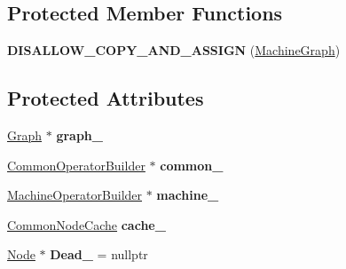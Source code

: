 \subsection*{Protected Member Functions}
\begin{DoxyCompactItemize}
\item 
\mbox{\label{classv8_1_1internal_1_1compiler_1_1MachineGraph_a85b5c32a6664345b2ca5fa4879167201}} 
{\bfseries D\+I\+S\+A\+L\+L\+O\+W\+\_\+\+C\+O\+P\+Y\+\_\+\+A\+N\+D\+\_\+\+A\+S\+S\+I\+GN} (\mbox{\hyperlink{classv8_1_1internal_1_1compiler_1_1MachineGraph}{Machine\+Graph}})
\end{DoxyCompactItemize}
\subsection*{Protected Attributes}
\begin{DoxyCompactItemize}
\item 
\mbox{\label{classv8_1_1internal_1_1compiler_1_1MachineGraph_a2d576e20daa768bd2992f6803fcf4fa6}} 
\mbox{\hyperlink{classv8_1_1internal_1_1compiler_1_1Graph}{Graph}} $\ast$ {\bfseries graph\+\_\+}
\item 
\mbox{\label{classv8_1_1internal_1_1compiler_1_1MachineGraph_afe1aba918b31ce63f7d096d805a11be3}} 
\mbox{\hyperlink{classv8_1_1internal_1_1compiler_1_1CommonOperatorBuilder}{Common\+Operator\+Builder}} $\ast$ {\bfseries common\+\_\+}
\item 
\mbox{\label{classv8_1_1internal_1_1compiler_1_1MachineGraph_ae301dbeb638badb41a7dbb2dd815ac2b}} 
\mbox{\hyperlink{classv8_1_1internal_1_1compiler_1_1MachineOperatorBuilder}{Machine\+Operator\+Builder}} $\ast$ {\bfseries machine\+\_\+}
\item 
\mbox{\label{classv8_1_1internal_1_1compiler_1_1MachineGraph_a3a833cdc7848b2fd632c979255de77da}} 
\mbox{\hyperlink{classv8_1_1internal_1_1compiler_1_1CommonNodeCache}{Common\+Node\+Cache}} {\bfseries cache\+\_\+}
\item 
\mbox{\label{classv8_1_1internal_1_1compiler_1_1MachineGraph_ab4503073a27ac2367a7d0cf301df680a}} 
\mbox{\hyperlink{classv8_1_1internal_1_1compiler_1_1Node}{Node}} $\ast$ {\bfseries Dead\+\_\+} = nullptr
\end{DoxyCompactItemize}


